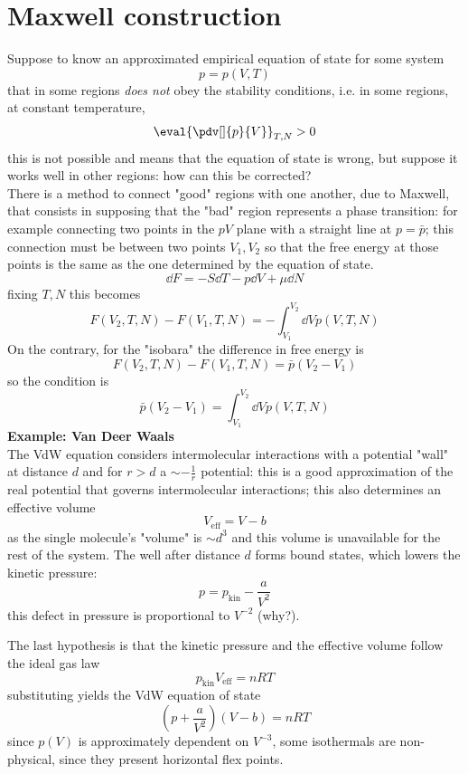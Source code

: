 \section{Maxwell construction}
Suppose to know an approximated empirical equation of state for some system
$$p=p(V,T)$$
that in some regions \textit{does not} obey the stability conditions, i.e.
in some regions, at constant temperature,
$$\eval{\pdv[]{p}{V}}_{T,N}>0$$
this is not possible and means that the equation of state is wrong, but suppose it
works well in other regions: how can this be corrected?\\
There is a method to connect "good" regions with one another, due to Maxwell, that
consists in supposing that the "bad" region represents a phase transition: for
example connecting two points in the $pV$ plane with a straight line at $p=\bar p$;
this connection must be between two points $V_1,V_2$ so that the free energy at
those points is the same as the one determined by the equation of state.
$$\dd F = -S\dd T -p\dd V +\mu \dd N$$
fixing $T,N$ this becomes
$$F(V_2,T,N) - F(V_1,T,N) = -\int_{V_1}^{V_2}\dd V p(V,T,N)$$
On the contrary, for the "isobara" the difference in free energy is
$$F(V_2,T,N)-F(V_1,T,N)=\bar p (V_2-V_1)$$
so the condition is
$$\bar p (V_2-V_1) = \int_{V_1}^{V_2}\dd V p(V,T,N)$$  
\textbf{Example: Van Deer Waals}\\
The VdW equation considers intermolecular interactions with a potential "wall" at
distance $d$ and for $r>d$ a $\sim -\frac{1}{r}$ potential: this is a good
approximation of the real potential that governs intermolecular interactions;
this also determines an effective volume
$$V_\text{eff} = V-b$$
as the single molecule's "volume" is $\sim d^3$ and this volume is unavailable for
the rest of the system. The well after distance $d$ forms bound states, which 
lowers the kinetic pressure:
$$p = p_\text{kin} - \frac{a}{V^2}$$
this defect in pressure is proportional to $V^{-2}$ (why?).

The last hypothesis is that the kinetic pressure and the effective volume follow
the ideal gas law
$$p_\text{kin}V_\text{eff} = nRT$$
substituting yields the VdW equation of state
$$\left(p+\frac{a}{V^2}\right)(V-b) = nRT$$
since $p(V)$ is approximately dependent on $V^{-3}$, some isothermals are
non-physical, since they present horizontal flex points.
